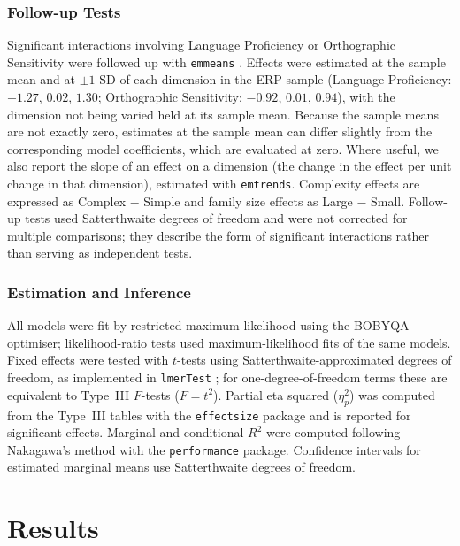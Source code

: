 \subsubsection{Follow-up Tests}

Significant interactions involving Language Proficiency or Orthographic Sensitivity were followed up with \texttt{emmeans} \citep{lenthEmmeansEstimatedMarginal2026}. Effects were estimated at the sample mean and at $\pm 1$ SD of each dimension in the ERP sample (Language Proficiency: $-1.27$, $0.02$, $1.30$; Orthographic Sensitivity: $-0.92$, $0.01$, $0.94$), with the dimension not being varied held at its sample mean. Because the sample means are not exactly zero, estimates at the sample mean can differ slightly from the corresponding model coefficients, which are evaluated at zero. Where useful, we also report the slope of an effect on a dimension (the change in the effect per unit change in that dimension), estimated with \texttt{emtrends}. Complexity effects are expressed as Complex $-$ Simple and family size effects as Large $-$ Small. Follow-up tests used Satterthwaite degrees of freedom and were not corrected for multiple comparisons; they describe the form of significant interactions rather than serving as independent tests.

\subsubsection{Estimation and Inference}

All models were fit by restricted maximum likelihood using the BOBYQA optimiser; likelihood-ratio tests used maximum-likelihood fits of the same models. Fixed effects were tested with $t$-tests using Satterthwaite-approximated degrees of freedom, as implemented in \texttt{lmerTest} \citep{kuznetsovaLmerTestPackageTests2017}; for one-degree-of-freedom terms these are equivalent to Type~III $F$-tests ($F = t^2$). Partial eta squared ($\eta^2_p$) was computed from the Type~III tables with the \texttt{effectsize} package and is reported for significant effects. Marginal and conditional $R^2$ were computed following Nakagawa's method with the \texttt{performance} package. Confidence intervals for estimated marginal means use Satterthwaite degrees of freedom.


\section{Results}

